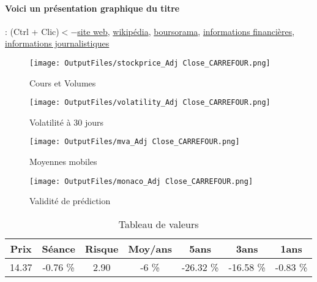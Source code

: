 \documentclass[11pt,a4paper]{report}%
\begin{document}
\paragraph{Voici un présentation graphique du titre} : (Ctrl + Clic)$<-$\href{https://www.carrefour.com/fr/finance}{site web}, \href{https://fr.wikipedia.org/wiki/Carrefour_(enseigne)}{wikipédia}, \href{https://www.boursorama.com/cours/1rPCA}{boursorama}, \href{https://www.qwant.com/?q=site:https:%2f%2fwww.easybourse.com%2faction-societe%2fCARREFOUR&t=web&client=ext-firefox-hp}{informations financières}, \href{https://bourse.lerevenu.com/cours-de-bourse/fiche-valeur-synthese/CARREFOUR/CA-FR}{informations journalistiques}
\begin{figure}[!htb]
   \begin{minipage}{0.5\textwidth}
     \centering
     \texttt{[image: OutputFiles/stockprice\_Adj Close\_CARREFOUR.png]}
     \caption{Cours et Volumes}\label{Fig:price_CARREFOUR}
   \end{minipage}\hfill
   \begin{minipage}{0.5\textwidth}
     \centering
     \texttt{[image: OutputFiles/volatility\_Adj Close\_CARREFOUR.png]}
     \caption{Volatilité à 30 jours}\label{Fig:volat_CARREFOUR}
   \end{minipage}
\end{figure}
\begin{figure}[!htb]
   \begin{minipage}{0.5\textwidth}
     \centering
     \texttt{[image: OutputFiles/mva\_Adj Close\_CARREFOUR.png]}
     \caption{Moyennes mobiles}\label{Fig:mva_CARREFOUR}
   \end{minipage}\hfill
   \begin{minipage}{0.5\textwidth}
     \centering
     \texttt{[image: OutputFiles/monaco\_Adj Close\_CARREFOUR.png]}
     \caption{Validité de prédiction}\label{Fig:prediction_CARREFOUR}
   \end{minipage}
\end{figure}

\begin{table}[H]
  \centering
    \begin{tabular}{|c|c|c|c|c|c|c|}
    \hline
    Prix & Séance & Risque  & Moy/ans & 5ans & 3ans & 1ans \\
    \hline
    14.37 &    -0.76 \%    & 2.90 & -6 \% & -26.32 \% & -16.58 \% & -0.83 \% \\
    \hline
    \end{tabular}%
        \label{tab:table_CARREFOUR}%
      \caption{Tableau de valeurs}
\end{table}%
\end{document}
